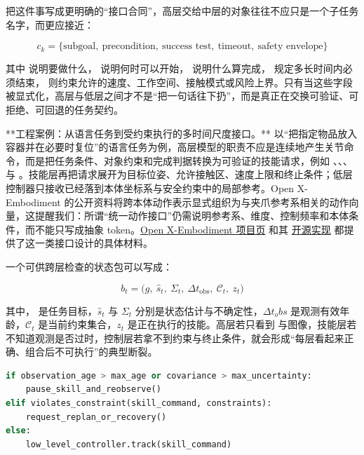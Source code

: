 把这件事写成更明确的“接口合同”，高层交给中层的对象往往不应只是一个子任务名字，而更应接近：

\begingroup
\scriptsize
\begin{equation*}
c_k = \{\text{subgoal},\ \text{precondition},\ \text{success test},\ \text{timeout},\ \text{safety envelope}\}
\end{equation*}
\endgroup

其中 \texttt{} 说明要做什么，\texttt{} 说明何时可以开始，\texttt{} 说明什么算完成，\texttt{} 规定多长时间内必须结束，\texttt{} 则约束允许的速度、工作空间、接触模式或风险上界。只有当这些字段被显式化，高层与低层之间才不是“把一句话往下扔”，而是真正在交换可验证、可拒绝、可回退的任务契约。

**工程案例：从语言任务到受约束执行的多时间尺度接口。** 以“把指定物品放入容器并在必要时复位”的语言任务为例，高层模型的职责不应是连续地产生关节命令，而是把任务条件、对象约束和完成判据转换为可验证的技能请求，例如 \texttt{}、\texttt{}、\texttt{}、\texttt{} 与 \texttt{}。技能层再把请求展开为目标位姿、允许接触区、速度上限和终止条件；低层控制器只接收已经落到本体坐标系与安全约束中的局部参考。Open X-Embodiment 的公开资料将跨本体动作表示显式组织为与夹爪参考系相关的动作向量，这提醒我们：所谓“统一动作接口”仍需说明参考系、维度、控制频率和本体条件，而不能只写成抽象 token。\href{https://robotic-transformer-x.github.io/}{Open X-Embodiment 项目页} 和其 \href{https://github.com/google-deepmind/open_x_embodiment}{开源实现} 都提供了这一类接口设计的具体材料。

一个可供跨层检查的状态包可以写成：

\begingroup
\footnotesize
\begin{equation*}
b_t = \bigl(g,\ \hat{s}_t,\ \Sigma_t,\ \Delta t_{\mathrm{obs}},\ \mathcal{C}_t,\ z_t\bigr)
\end{equation*}
\endgroup

其中，\texttt{} 是任务目标，\(\hat{s}_t\) 与 \(\Sigma_t\) 分别是状态估计与不确定性，\(\Delta t_obs\) 是观测有效年龄，\(\mathcal{C}_t\) 是当前约束集合，\(z_t\) 是正在执行的技能。高层若只看到 \texttt{} 与图像，技能层若不知道观测是否过时，控制层若拿不到约束与终止条件，就会形成“每层看起来正确、组合后不可执行”的典型断裂。

\begin{lstlisting}[language=python]
if observation_age > max_age or covariance > max_uncertainty:
    pause_skill_and_reobserve()
elif violates_constraint(skill_command, constraints):
    request_replan_or_recovery()
else:
    low_level_controller.track(skill_command)
\end{lstlisting}

